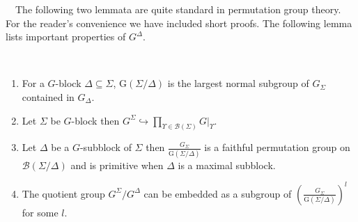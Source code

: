\documentclass{llncs}
\newcommand{\Blocks}[1]{{\ensuremath{\mathcal{B}\left(#1\right)}}}
\newcommand{\Gof}[1]{{\ensuremath{\mathrm{G}\left(#1\right)}}}
\newcommand{\pr}[2]{{\ensuremath{\left.{#1}\right\vert_{#2}}}}
\begin{document}
~~The following two lemmata are quite standard
in permutation group theory. For the reader's convenience we have
included short proofs. The following lemma lists important properties
of $G^\Delta$.

\begin{lemma}\label{lem-gsupdelta}\hfill{~}
  \begin{enumerate}
  \item For a $G$-block $\Delta \subseteq \Sigma$,
    $\Gof{\Sigma/\Delta}$ is the largest normal subgroup of $G_\Sigma$
    contained in $G_\Delta$.

  \item Let $\Sigma$ be $G$-block then $G^{\Sigma} \hookrightarrow
    \prod_{\Upsilon \in \Blocks{\Sigma}} \pr{G}{\Upsilon}$.

  \item Let $\Delta$ be a $G$-subblock of $\Sigma$ then
    $\frac{G_\Sigma}{\Gof{\Sigma/\Delta}}$ is a faithful permutation
    group on $\Blocks{\Sigma/\Delta}$ and is primitive when $\Delta$
    is a maximal subblock.

  \item The quotient group $G^\Sigma/G^\Delta$ can be embedded as a
    subgroup of $\left(\frac{G_\Sigma}{\Gof{\Sigma/\Delta}}\right)^l$
    for some $l$.

\end{enumerate}
\end{lemma}
\end{document}
